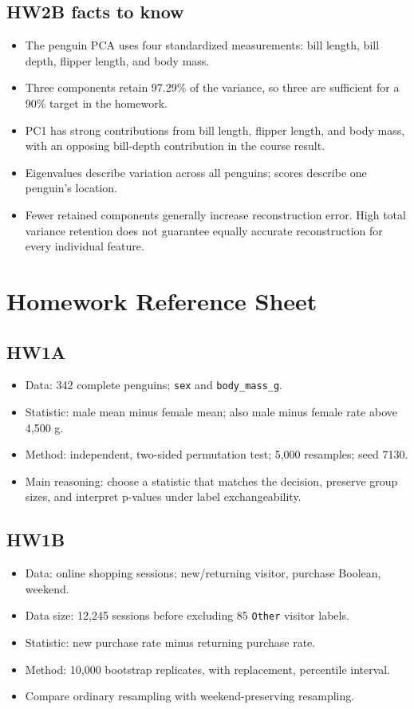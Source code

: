 \documentclass[11pt]{article}
\begin{document}
\subsection{HW2B facts to know}
\begin{itemize}
	\item The penguin PCA uses four standardized measurements: bill length, bill depth, flipper length, and body mass.
	\item Three components retain 97.29\% of the variance, so three are sufficient for a 90\% target in the homework.
	\item PC1 has strong contributions from bill length, flipper length, and body mass, with an opposing bill-depth contribution in the course result.
	\item Eigenvalues describe variation across all penguins; scores describe one penguin's location.
	\item Fewer retained components generally increase reconstruction error. High total variance retention does not guarantee equally accurate reconstruction for every individual feature.
\end{itemize}

\section{Homework Reference Sheet}
\subsection{HW1A}
\begin{itemize}
	\item Data: 342 complete penguins; \texttt{sex} and \texttt{body\_mass\_g}.
	\item Statistic: male mean minus female mean; also male minus female rate above 4,500 g.
	\item Method: independent, two-sided permutation test; 5,000 resamples; seed 7130.
	\item Main reasoning: choose a statistic that matches the decision, preserve group sizes, and interpret p-values under label exchangeability.
\end{itemize}

\subsection{HW1B}
\begin{itemize}
	\item Data: online shopping sessions; new/returning visitor, purchase Boolean, weekend.
	\item Data size: 12,245 sessions before excluding 85 \texttt{Other} visitor labels.
	\item Statistic: new purchase rate minus returning purchase rate.
	\item Method: 10,000 bootstrap replicates, with replacement, percentile interval.
	\item Compare ordinary resampling with weekend-preserving resampling.
\end{itemize}
\end{document}
